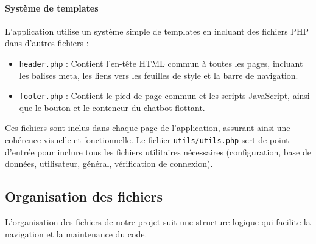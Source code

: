 \documentclass[a4paper,12pt]{article}
\begin{document}
\vspace{0.5em}

\paragraph{Système de templates}
L'application utilise un système simple de templates en incluant des fichiers PHP dans d'autres fichiers :
\begin{itemize}
  \item \texttt{header.php} : Contient l'en-tête HTML commun à toutes les pages, incluant les balises meta, les liens vers les feuilles de style et la barre de navigation.
  \item \texttt{footer.php} : Contient le pied de page commun et les scripts JavaScript, ainsi que le bouton et le conteneur du chatbot flottant.
\end{itemize}
Ces fichiers sont inclus dans chaque page de l'application, assurant ainsi une cohérence visuelle et fonctionnelle. Le fichier \texttt{utils/utils.php} sert de point d'entrée pour inclure tous les fichiers utilitaires nécessaires (configuration, base de données, utilisateur, général, vérification de connexion).

\subsection{Organisation des fichiers}
L'organisation des fichiers de notre projet suit une structure logique qui facilite la navigation et la maintenance du code.
\end{document}

